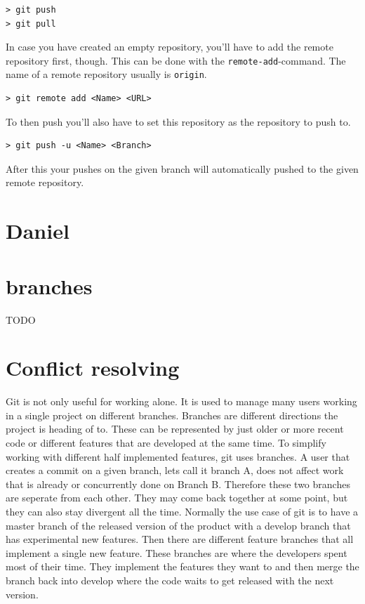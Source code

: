 \documentclass[a4paper, 12pt]{article}
\begin{document}
		\begin{lstlisting}
> git push
> git pull
		\end{lstlisting}
		
		In case you have created an empty repository, you'll have to add the remote repository first, though. This can be done with the \lstinline|remote-add|-command. The name of a remote repository usually is \lstinline|origin|.
		
		\begin{lstlisting}
> git remote add <Name> <URL>
		\end{lstlisting}
		
		To then push you'll also have to set this repository as the repository to push to.
		
		\begin{lstlisting}
> git push -u <Name> <Branch>
		\end{lstlisting}
		
		After this your pushes on the given branch will automatically pushed to the given remote repository.

	\section{Daniel}
			
	\section{branches}
	
	TODO
	\section{Conflict resolving}
		
		Git is not only useful for working alone. It is used to manage many users working in a single project on different branches. Branches are different directions the project is heading of to. These can be represented by just older or more recent code or different features that are developed at the same time. To simplify working with different half implemented features, git uses branches. A user that creates a commit on a given branch, lets call it branch A, does not affect work that is already or concurrently done on Branch B. Therefore these two branches are seperate from each other. They may come back together at some point, but they can also stay divergent all the time. Normally the use case of git is to have a master branch of the released version of the product with a develop branch that has experimental new features. Then there are different feature branches that all implement a single new feature. These branches are where the developers spent most of their time. They implement the features they want to and then merge the branch back into develop where the code waits to get released with the next version.
		
\end{document}
